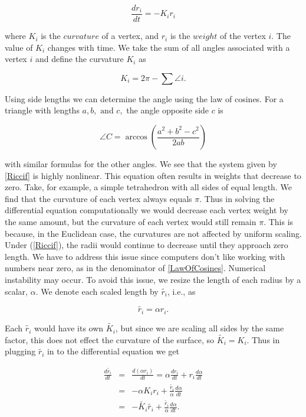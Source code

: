 \documentclass[12pt]{article}
\begin{document}
  \begin{equation}
  \label{Riccif}
  \frac{dr_i}{{dt}} = -K_ir_i
  \end{equation}
  
\noindent where $K_i$ is the $curvature$ of a vertex, and $r_i$ is the $weight$ of the vertex $i$. The value of $K_i$ changes with time. We take the sum of all angles associated with a vertex $i$ and define the curvature $K_i$ as

\begin{equation}
K_i = 2\pi - \sum{\angle i}.
\end{equation}

Using side lengths we can determine the angle using the law of cosines. For a triangle with lengths $a, b,\mbox{ and }c,$ the angle opposite side $c$ is
  
  \begin{equation}
  \label{LawOfCosines}
  \angle C = \arccos(\frac{a^2 + b^2 - c^2}{2ab})
  \end{equation}
  
\noindent with similar formulas for the other angles. We see that the system given by \ref{Riccif} is highly nonlinear. This equation often results in weights that decrease to zero. Take, for example, a simple tetrahedron with all sides of equal length. We find that the curvature of each vertex always equals $\pi$. Thus in solving the differential equation computationally we would decrease each vertex weight by the same amount, but the curvature of each vertex would still remain $\pi.$ This is because, in the Euclidean case, the curvatures are not affected by uniform scaling. Under (\ref{Riccif}), the radii would continue to decrease until they approach zero length. We have to address this issue since computers don't like working with numbers near zero, as in the denominator of \ref{LawOfCosines}. Numerical instability may occur. To avoid this issue, we resize the length of each radius by a scalar, $\alpha$. We denote each scaled length by $\tilde{r_i}$, i.e., as
 
$$ \tilde{r_i} = \alpha r_i. $$ 
 
\noindent Each $\tilde{r_i}$ would have its own $\tilde{K_i}$, but since we are scaling all sides by the same factor, this does not effect the curvature of the surface, so $\tilde{K_i} = K_i$. Thus in plugging $\tilde{r_i}$ in to the differential equation we get
 
 \begin{eqnarray}
 \label{ref1}
 \frac{d\tilde{r_i}}{dt} &=& \frac{d(\alpha r_i)}{dt} = \alpha \frac{dr_i}{dt} + r_i\frac{d\alpha}{dt}\nonumber\\
 &=& -\alpha K_ir_i + \frac{\tilde{r_i}}{\alpha}\frac{d\alpha}{dt} \nonumber \\
 &=& -\tilde{K_i}\tilde{r_i} + \frac{\tilde{r_i}}{\alpha}\frac{d\alpha}{dt}.
 \end{eqnarray}
 
\end{document}
